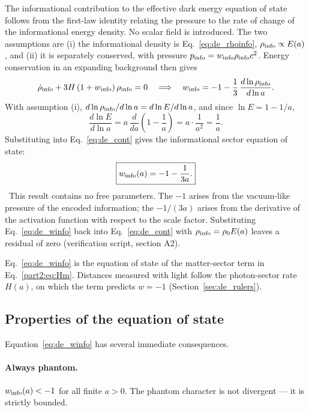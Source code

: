 The informational contribution to the effective dark energy equation of state follows from the first-law identity relating the pressure to the
rate of change of the informational energy density. No scalar field is introduced. The two assumptions are (i) the informational density is
Eq.~\eqref{eq:de_rhoinfo}, $\rho_{\rm info}\propto E(a)$, and (ii) it is separately conserved, with pressure $p_{\rm info}=w_{\rm info}\rho_{\rm info}c^2$.
Energy conservation in an expanding background then gives
\begin{equation}\dot\rho_{\rm info}+3H\,(1+w_{\rm info})\,\rho_{\rm info}=0
\quad\Longrightarrow\quad w_{\rm info}=-1-\frac13\,\frac{d\ln\rho_{\rm info}}{d\ln a}.\label{eq:de_cont}\end{equation}
With assumption (i), $d\ln\rho_{\rm info}/d\ln a=d\ln E/d\ln a$, and since $\ln E=1-1/a$,
\begin{equation}\frac{d\ln E}{d\ln a}=a\,\frac{d}{da}\left(1-\frac1a\right)=a\cdot\frac{1}{a^2}=\frac1a .\label{eq:de_dlnE}\end{equation}
Substituting into Eq.~\eqref{eq:de_cont} gives the informational sector equation of state:
\begin{equation}\boxed{w_{\rm info}(a)=-1-\frac{1}{3a}.}\label{eq:de_winfo}\end{equation}
\derived\ This result contains no free parameters. The $-1$ arises from the vacuum-like pressure of the encoded information; the $-1/(3a)$ arises
from the derivative of the activation function with respect to the scale factor. Substituting Eq.~\eqref{eq:de_winfo} back into
Eq.~\eqref{eq:de_cont} with $\rho_{\rm info}=\rho_0E(a)$ leaves a residual of zero (verification script, section A2).

Eq.~\eqref{eq:de_winfo} is the equation of state of the matter-sector term in Eq.~\eqref{part2:eq:Hm}. Distances measured with light follow the
photon-sector rate $H(a)$, on which the term predicts $w=-1$ (Section~\ref{sec:de_rulers}).

\subsection{Properties of the equation of state}\label{sec:de_props}
Equation~\eqref{eq:de_winfo} has several immediate consequences.

\paragraph{Always phantom.} $w_{\rm info}(a)<-1$ for all finite $a>0$. The phantom character is not divergent --- it is strictly bounded. \derived

